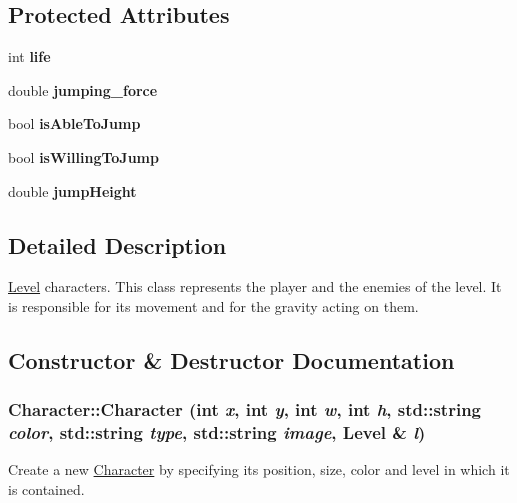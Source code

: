\subsection*{Protected Attributes}
\begin{DoxyCompactItemize}
\item 
\hypertarget{classCharacter_a5d67b59885aa532b80cecee4e5d79349}{
int {\bfseries life}}
\label{classCharacter_a5d67b59885aa532b80cecee4e5d79349}

\item 
\hypertarget{classCharacter_a5ae72b18bdb3b118819ceaed4fe2fda2}{
double {\bfseries jumping\_\-force}}
\label{classCharacter_a5ae72b18bdb3b118819ceaed4fe2fda2}

\item 
\hypertarget{classCharacter_a164cc88dccff96c3a4ae10bab576d816}{
bool {\bfseries isAbleToJump}}
\label{classCharacter_a164cc88dccff96c3a4ae10bab576d816}

\item 
\hypertarget{classCharacter_a3030115f048e24509b906635763aa2f4}{
bool {\bfseries isWillingToJump}}
\label{classCharacter_a3030115f048e24509b906635763aa2f4}

\item 
\hypertarget{classCharacter_ae58d05c06ac80e567154e79b1b4c0665}{
double {\bfseries jumpHeight}}
\label{classCharacter_ae58d05c06ac80e567154e79b1b4c0665}

\end{DoxyCompactItemize}


\subsection{Detailed Description}
\hyperlink{classLevel}{Level} characters. This class represents the player and the enemies of the level. It is responsible for its movement and for the gravity acting on them. 

\subsection{Constructor \& Destructor Documentation}
\hypertarget{classCharacter_a38fd0fe8b748b17cfda79f3c8b4e3e58}{
\subsubsection[{Character}]{\setlength{\rightskip}{0pt plus 5cm}Character::Character (int {\em x}, \/  int {\em y}, \/  int {\em w}, \/  int {\em h}, \/  std::string {\em color}, \/  std::string {\em type}, \/  std::string {\em image}, \/  {\bf Level} \& {\em l})}}
\label{classCharacter_a38fd0fe8b748b17cfda79f3c8b4e3e58}
Create a new \hyperlink{classCharacter}{Character} by specifying its position, size, color and level in which it is contained. 

